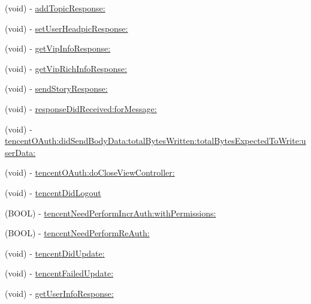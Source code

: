 \begin{DoxyCompactItemize}
(void) -\/ \mbox{\hyperlink{protocol_tencent_session_delegate-p_a708d12ee5e08e418428f834b9e7aefd6}{add\+Topic\+Response\+:}}
\item 
(void) -\/ \mbox{\hyperlink{protocol_tencent_session_delegate-p_ae487da5d4b7d86179c8f98cbceac848d}{set\+User\+Headpic\+Response\+:}}
\item 
(void) -\/ \mbox{\hyperlink{protocol_tencent_session_delegate-p_ad0d91a95626727d1dc20fb96df2d442a}{get\+Vip\+Info\+Response\+:}}
\item 
(void) -\/ \mbox{\hyperlink{protocol_tencent_session_delegate-p_aa6c9ad57c523c339220224ed84c22bf3}{get\+Vip\+Rich\+Info\+Response\+:}}
\item 
(void) -\/ \mbox{\hyperlink{protocol_tencent_session_delegate-p_ac6628547be6fc0208797fbd6a5d7830c}{send\+Story\+Response\+:}}
\item 
(void) -\/ \mbox{\hyperlink{protocol_tencent_session_delegate-p_aec2b0e15cdc45c30b0f67b708f97c44a}{response\+Did\+Received\+:for\+Message\+:}}
\item 
(void) -\/ \mbox{\hyperlink{protocol_tencent_session_delegate-p_a389127c47a6ad7efbd1ec738efd7ad02}{tencent\+O\+Auth\+:did\+Send\+Body\+Data\+:total\+Bytes\+Written\+:total\+Bytes\+Expected\+To\+Write\+:user\+Data\+:}}
\item 
(void) -\/ \mbox{\hyperlink{protocol_tencent_session_delegate-p_afb8ed4decd4a2c070ae709e08bdfcab2}{tencent\+O\+Auth\+:do\+Close\+View\+Controller\+:}}
\item 
(void) -\/ \mbox{\hyperlink{protocol_tencent_session_delegate-p_aa7032a93d9fac4228335c592a5cdefeb}{tencent\+Did\+Logout}}
\item 
(B\+O\+OL) -\/ \mbox{\hyperlink{protocol_tencent_session_delegate-p_a0e01d339c87d58e9386068abd18fc93b}{tencent\+Need\+Perform\+Incr\+Auth\+:with\+Permissions\+:}}
\item 
(B\+O\+OL) -\/ \mbox{\hyperlink{protocol_tencent_session_delegate-p_af961aa9926514b095a51a3dfa8514a38}{tencent\+Need\+Perform\+Re\+Auth\+:}}
\item 
(void) -\/ \mbox{\hyperlink{protocol_tencent_session_delegate-p_ab6add86989fc2acf54c93c6adb7e445e}{tencent\+Did\+Update\+:}}
\item 
(void) -\/ \mbox{\hyperlink{protocol_tencent_session_delegate-p_aa62f3774c40da79bd17aff01b4745518}{tencent\+Failed\+Update\+:}}
\item 
(void) -\/ \mbox{\hyperlink{protocol_tencent_session_delegate-p_a9cff2e12ed27916e865c8048ee0c176c}{get\+User\+Info\+Response\+:}}
\item 

\end{DoxyCompactItemize}
